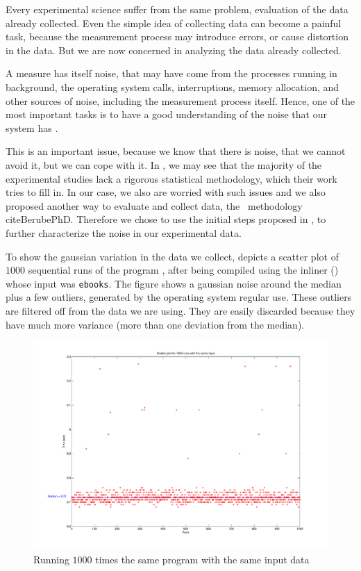 
Every experimental science suffer from the same problem, evaluation of the data already collected. Even the simple idea of collecting data can become a painful task, because the measurement process may introduce errors, or cause distortion in the data. But we are now concerned in analyzing the data already collected.

A measure has itself noise, that may have come from the processes running in background, the operating system calls, interruptions, memory allocation, and other sources of noise, including the measurement process itself. Hence, one of the most important tasks is to have a good understanding of the noise that our system has \cite{Kalibera2013}.

This is an important issue, because we know that there is noise, that we cannot avoid it, but we can cope with it. In \cite{Kalibera2013}, we may see that the majority of the experimental studies lack a rigorous statistical methodology, which their work tries to fill in. In our case, we also are worried with such issues and we also proposed another way to evaluate and collect data, the \CP\ methodology cite{BerubePhD}. Therefore we chose to use the initial steps proposed in \cite{Kalibera2013}, to further characterize the noise in our experimental data.

To show the gaussian variation in the data we collect,  depicts a scatter plot of $1000$ sequential runs of the program \bzip, after being compiled using the  inliner (\llvm) whose input was {\tt ebooks}. The figure shows a gaussian noise around the median plus a few outliers, generated by the operating system regular use. These outliers are filtered off from the data we are using. They are easily discarded because they have much more variance (more than one deviation from the median).

\begin{figure}
  \centering
  \includegraphics[width=1.00\linewidth]{Figures/nt1000}
  \caption{Running $1000$ times the same program with the same input data}
  \label{fig:gauss}
\end{figure}

